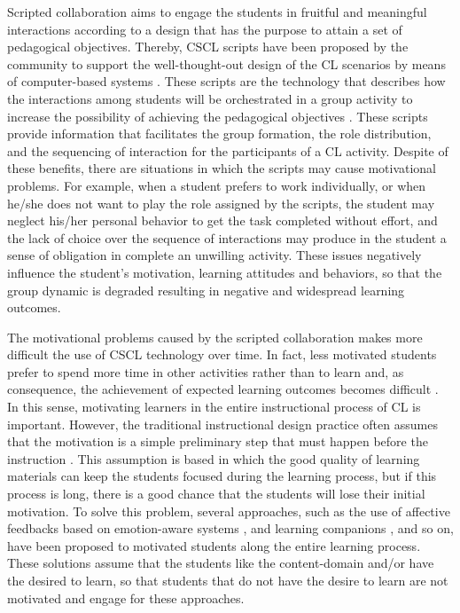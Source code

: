 Scripted collaboration aims to engage the students in fruitful and meaningful interactions according to a design that has the purpose to attain a set of pedagogical objectives. Thereby, CSCL scripts have been proposed by the community to support the well-thought-out design of the CL scenarios by means of computer-based systems \cite{FischerKollarStegmannWeckerZottmann2013,KobbeWeinbergerDillenbourgHarrerHamalainenHakkinenFischer2007}. These scripts are the technology that describes how the interactions among students will be orchestrated in a group activity to increase the possibility of achieving the pedagogical objectives \cite{WeinbergerErtlFischerMandl2005}. These scripts provide information that facilitates the group formation, the role distribution, and the sequencing of interaction for the participants of a CL activity. Despite of these benefits, there are situations in which the scripts may cause motivational problems. For example, when a student prefers to work individually, or when he/she does not want to play the role assigned by the scripts, the student may neglect his/her personal behavior to get the task completed without effort, and the lack of choice over the sequence of interactions may produce in the student a sense of obligation in complete an unwilling activity.
These issues negatively influence the student's motivation, learning attitudes and behaviors, so that the group dynamic is degraded resulting in negative and widespread learning outcomes.

The motivational problems caused by the scripted collaboration makes more difficult the use of CSCL technology over time. In fact, less motivated students prefer to spend more time in other activities rather than to learn and, as consequence, the achievement of expected learning outcomes becomes difficult \cite{Crook2000, FaloutElwoodHood2009, SchoorBannert2011}. In this sense, motivating learners in the entire instructional process of CL is important. However, the traditional instructional design practice often assumes that the motivation is a simple preliminary step that must happen before the instruction \cite{ChanAhern1999, Keller1987}. This assumption is based in which the good quality of learning materials can keep the students focused during the learning process, but if this process is long, there is a good chance that the students will lose their initial motivation. To solve this problem, several approaches, such as the use of affective feedbacks based on emotion-aware systems \cite{FeidakisDaradoumisCaballeConesa2014,FeidakisCaballeDaradoumisJimenezConesa2014}, and learning companions \cite{WoolfBurlesonArroyoDragonCooperPicard2009}, and so on, have been proposed to motivated students along the entire learning process. These solutions assume that the students like the content-domain and/or have the desired to learn, so that students that do not have the desire to learn are not motivated and engage for these approaches.

